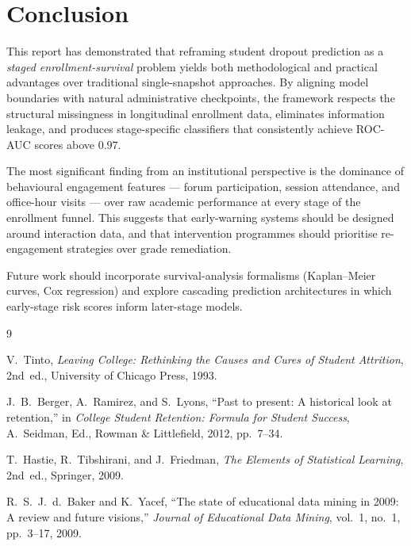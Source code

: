 \documentclass[8pt,twocolumn]{extarticle}
\begin{document}
\section{Conclusion}\label{sec:conclusion}

This report has demonstrated that reframing student dropout prediction as a
\emph{staged enrollment-survival} problem yields both methodological and practical
advantages over traditional single-snapshot approaches.
By aligning model boundaries with natural administrative checkpoints, the framework
respects the structural missingness in longitudinal enrollment data, eliminates
information leakage, and produces stage-specific classifiers that consistently
achieve ROC-AUC scores above $0.97$.

The most significant finding from an institutional perspective is the dominance of
behavioural engagement features --- forum participation, session attendance, and
office-hour visits --- over raw academic performance at every stage of the enrollment
funnel.  This suggests that early-warning systems should be designed around interaction
data, and that intervention programmes should prioritise re-engagement strategies
over grade remediation.

Future work should incorporate survival-analysis formalisms (Kaplan--Meier curves,
Cox regression) and explore cascading prediction architectures in which early-stage
risk scores inform later-stage models.

\begin{thebibliography}{9}

V.~Tinto,
\textit{Leaving College: Rethinking the Causes and Cures of Student Attrition},
2nd~ed., University of Chicago Press, 1993.

J.~B.~Berger, A.~Ramirez, and S.~Lyons,
``Past to present: A historical look at retention,''
in \textit{College Student Retention: Formula for Student Success},
A.~Seidman, Ed., Rowman \& Littlefield, 2012, pp.~7--34.

T.~Hastie, R.~Tibshirani, and J.~Friedman,
\textit{The Elements of Statistical Learning},
2nd~ed., Springer, 2009.

R.~S.~J.~d.~Baker and K.~Yacef,
``The state of educational data mining in 2009: A review and future visions,''
\textit{Journal of Educational Data Mining}, vol.~1, no.~1, pp.~3--17, 2009.

\end{thebibliography}
\end{document}
